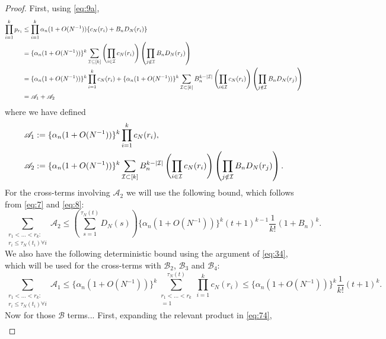 \documentclass{article}
\newcommand{\1}[1]{\mathbbm{1}_{#1}}
\begin{document}
\begin{proof}
First, using \eqref{eq:9a},
\begin{align}
\prod_{i=1}^k p_{r_i} 
&\leq \prod_{i=1}^k \alpha_n (1+O(N^{-1})) \{ c_N(r_i) + B_n D_N(r_i) \} \notag\\
&= \{ \alpha_n (1+O(N^{-1})) \}^k \sum_{\mathcal{I} \subseteq [k]}
\left( \prod_{i \in \mathcal{I}} c_N(r_i) \right)
\left( \prod_{j \notin \mathcal{I}} B_n D_N(r_j) \right) \notag\\
&= \{ \alpha_n (1+O(N^{-1})) \}^k \prod_{i=1}^k  c_N(r_i)
+ \{ \alpha_n (1+O(N^{-1})) \}^k \sum_{\mathcal{I} \subset [k]} B_n^{k - |\mathcal{I}|}
\left( \prod_{i \in \mathcal{I}} c_N(r_i) \right)
\left( \prod_{j \notin \mathcal{I}} B_n D_N(r_j) \right) \notag\\
& = \mathscr{A}_1 + \mathscr{A}_2
\end{align}
where we have defined
\begin{align}
&\mathscr{A}_1 := \{ \alpha_n (1+O(N^{-1})) \}^k \prod_{i=1}^k  c_N(r_i) , \notag\\
&\mathscr{A}_2 := \{ \alpha_n (1+O(N^{-1})) \}^k \sum_{\mathcal{I} \subset [k]} B_n^{k - |\mathcal{I}|}
\left( \prod_{i \in \mathcal{I}} c_N(r_i) \right)
\left( \prod_{j \notin \mathcal{I}} B_n D_N(r_j) \right) .\label{eq:78}
\end{align}
For the cross-terms involving $\mathscr{A}_2$ we will use the following bound, which follows from \eqref{eq:7} and \eqref{eq:8}:
\begin{equation}\label{eq:79}
\sum_{\substack{r_1 <\dots< r_k :\\ r_i \leq \tau_N(t_i) \forall i}} \mathscr{A}_2 
\leq \left( \sum_{s=1}^{\tau_N(t)} D_N(s) \right) 
\{ \alpha_n (1+O(N^{-1})) \}^k (t+1)^{k-1} \frac{1}{k!} (1+B_n)^k .
\end{equation}
We also have the following deterministic bound using the argument of \eqref{eq:34}, which will be used for the cross-terms with $\mathscr{B}_2$, $\mathscr{B}_3$ and $\mathscr{B}_4$:
\begin{equation}\label{eq:80}
\sum_{\substack{r_1 <\dots< r_k :\\ r_i \leq \tau_N(t_i) \forall i}} \mathscr{A}_1
\leq \{ \alpha_n (1+O(N^{-1})) \}^k \sum_{\substack{r_1 <\dots< r_k \\ =1}}^{\tau_N(t)} \prod_{i=1}^k c_N(r_i) 
\leq \{ \alpha_n (1+O(N^{-1})) \}^k \frac{1}{k!} (t+1)^k .
\end{equation}
Now for those $\mathscr{B}$ terms... 
First, expanding the relevant product in \eqref{eq:74},
\begin{align}

\end{align}
\end{proof}
\end{document}
